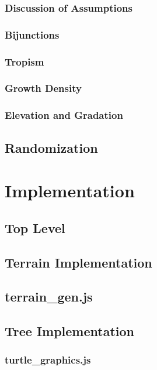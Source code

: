 \documentclass{article}
\begin{document}
            \subsubsection{Discussion of Assumptions}
            \subsubsection{Bijunctions} %
            \subsubsection{Tropism}
            \subsubsection{Growth Density}
            \subsubsection{Elevation and Gradation}

        \subsection{Randomization}

    \section{Implementation}
        \subsection{Top Level}
        \subsection{Terrain Implementation}
            \subsection{terrain\_gen.js}
        \subsection{Tree Implementation}
            \subsubsection{turtle\_graphics.js}
\end{document}
